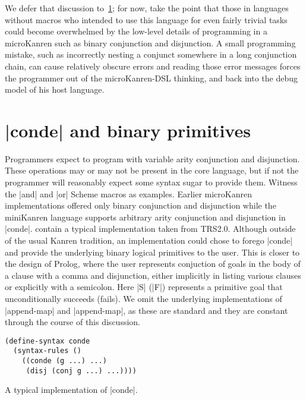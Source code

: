 \documentclass[sigplan,screen,draft,anonymous,review,natbib=false]{acmart}
\begin{document}
We defer that discussion to~\cref{sec:conde}; for now, take the point
that those in languages without macros who intended to use this
language for even fairly trivial tasks could become overwhelmed by the
low-level details of programming in a microKanren such as binary
conjunction and disjunction. A small programming mistake, such as
incorrectly nesting a conjunct somewhere in a long conjunction chain,
can cause relatively obscure errors and reading those error messages
forces the programmer out of the microKanren-DSL thinking, and back
into the debug model of his host language.

\section{\rackinline|conde| and binary primitives}\label{sec:conde}


Programmers expect to program with variable arity conjunction and
disjunction. These operations may or may not be present in the core
language, but if not the programmer will reasonably expect some syntax
sugar to provide them. Witness the \rackinline|and| and
\rackinline|or| Scheme macros as examples. Earlier microKanren
implementations offered only binary conjunction and disjunction while
the miniKanren language supports arbitrary arity conjunction and
disjunction in \rackinline|conde|.
contain a typical implementation taken from TRS2.0. Although outside
of the usual Kanren tradition, an implementation could chose to forego
\rackinline|conde| and provide the underlying binary logical
primitives to the user. This is closer to the design of Prolog, where
the user represents conjuction of goals in the body of a clause with a
comma and disjunction, either implicitly in listing various clauses or
explicitly with a semicolon. Here \rackinline|S| (\rackinline|F|)
represents a primitive goal that unconditionally succeeds (fails). We
omit the underlying implementations of \rackinline|append-map| and
\rackinline|append-map|, as these are standard and they are constant
through the course of this discussion.

\begin{listing}
  \begin{verbatim}
(define-syntax conde
  (syntax-rules ()
    ((conde (g ...) ...)
     (disj (conj g ...) ...))))
  \end{verbatim}
  \caption{A typical implementation of \rackinline|conde|.}
  \label{mnt:conde-implementation}
\end{listing}
\end{document}
